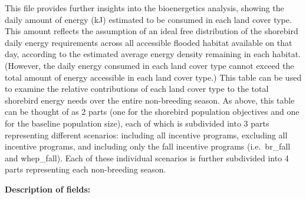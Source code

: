 \documentclass[]{article}
\begin{document}
This file provides further insights into the bioenergetics analysis,
showing the daily amount of energy (kJ) estimated to be consumed in each
land cover type. This amount reflects the assumption of an ideal free
distribution of the shorebird daily energy requirements across all
accessible flooded habitat available on that day, according to the
estimated average energy density remaining in each habitat. (However,
the daily energy consumed in each land cover type cannot exceed the
total amount of energy accessible in each land cover type.) This table
can be used to examine the relative contributions of each land cover
type to the total shorebird energy needs over the entire non-breeding
season. As above, this table can be thought of as 2 parts (one for the
shorebird population objectives and one for the baseline population
size), each of which is subdivided into 3 parts representing different
scenarios: including all incentive programs, excluding all incentive
programs, and including only the fall incentive programs (i.e.~br\_fall
and whep\_fall). Each of these individual scenarios is further
subdivided into 4 parts representing each non-breeding season.

\textbf{Description of fields:}
\end{document}
